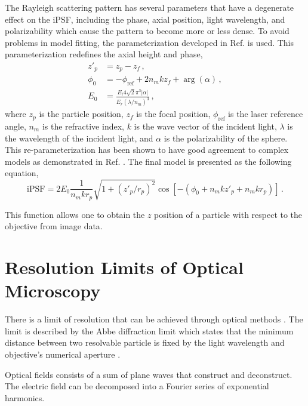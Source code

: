 The Rayleigh scattering pattern has several parameters that have a degenerate effect on the iPSF, including the phase, axial position, light wavelength, and polarizability which cause the pattern to become more or less dense. To avoid problems in model fitting, the parameterization developed in Ref. \cite{dewitPreciseCharacterizationNanometerscale2023} is used. This parameterization redefines the axial height and phase,
\begin{align}
    z'_p &= z_p - z_f\,,\\
    \phi_0 &= -\phi_\mathrm{ref} + 2n_m k z_f + \arg(\alpha)\,,\\
    E_0 &= \frac{E_i 4\sqrt{2}\pi^3|\alpha|}{E_r (\lambda/n_m)^3}\,,
\end{align}where $z_p$ is the particle position, $z_f$ is the focal position, $\phi_\mathrm{ref}$ is the laser reference angle, $n_m$ is the refractive index, $k$ is the wave vector of the incident light, $\lambda$ is the wavelength of the incident light,  and $\alpha$ is the polarizability of the sphere. This re-parameterization has been shown to have good agreement to complex models as demonstrated in Ref. \cite{dewitPreciseCharacterizationNanometerscale2023}. The final model is presented as the following equation,
\begin{equation}
    \mathrm{iPSF} = 2 E_0 \frac{1}{n_m k r_p}\sqrt{1 + \left(z'_p/r_p\right)^2} \cos \left[-\left(\phi_0 + n_m k z'_p + n_m k r_p\right)\right]\,.
\end{equation}

This function allows one to obtain the $z$ position of a particle with respect to the objective from image data.

\clearpage
\section{Resolution Limits of Optical Microscopy}

There is a limit of resolution that can be achieved through optical methods \cite{abbe1873beitraege}. The limit is described by the Abbe diffraction limit which states that the minimum distance between two resolvable particle is fixed by the light wavelength and objective's numerical aperture \cite{abbe1873beitraege, jonkman_18_2003}. 

Optical fields consists of a sum of plane waves that construct and deconstruct. The electric field can be decomposed into a Fourier series of exponential harmonics. \cite{Steck2021} 


